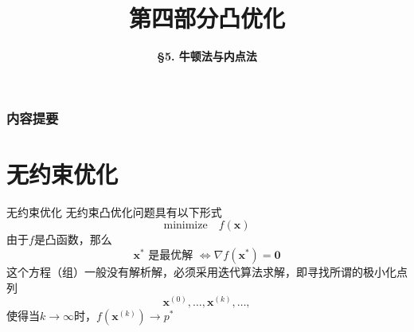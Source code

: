 



\title[Convex Optimization]{\LARGE \bfseries 第四部分\quad 凸优化} %
\author[Newton’s Method and Interior-Point Methods] %
{\Large \bfseries \S 5. 牛顿法与内点法}
\date{}






\begin{frame}

\titlepage %

\end{frame}


\begin{frame}
\frametitle{内容提要} %
\tableofcontents %
\end{frame}


\section{无约束优化}


\begin{frame}

\begin{block}{无约束优化}
无约束凸优化问题具有以下形式
\[\text{minimize} \quad f(\mathbf{x})\]
由于$f$是凸函数，那么
\[\mathbf{x}^* \text{ 是最优解 } \Longleftrightarrow \nabla f(\mathbf{x}^*) = \mathbf{0}\]
这个方程（组）一般没有解析解，必须采用迭代算法求解，即寻找所谓的极小化点列
\[\mathbf{x}^{(0)}, \ldots, \mathbf{x}^{(k)}, \ldots,\]
使得当$k\to\infty$时，$f(\mathbf{x}^{(k)}) \to p^*$
\end{block}

\end{frame}

